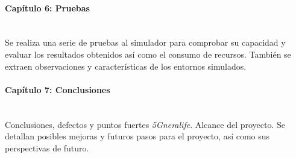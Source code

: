 \paragraph{Capítulo 6: Pruebas} \mbox{} \\
    Se realiza una serie de pruebas al simulador para comprobar su capacidad y evaluar los resultados obtenidos así como el consumo de recursos. También se extraen observaciones y características de los entornos simulados.

\paragraph{Capítulo 7: Conclusiones} \mbox{} \\
    Conclusiones, defectos y puntos fuertes \textit{5Gneralife}. Alcance del proyecto. Se detallan posibles mejoras y futuros pasos para el proyecto, así como sus perspectivas de futuro.

